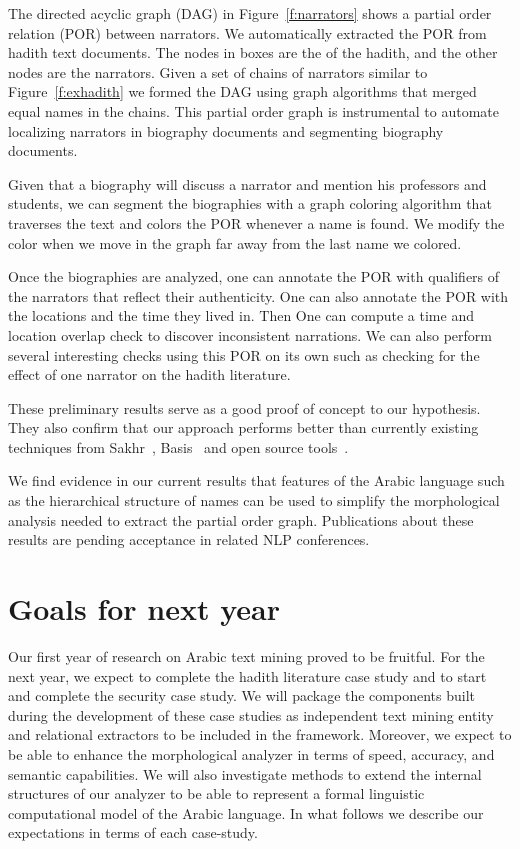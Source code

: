 \documentclass[12pt]{article}
\begin{document}
The directed acyclic graph (DAG) 
in Figure~\ref{f:narrators} shows a partial order relation (POR) between
narrators.
We automatically extracted the POR from hadith text 
documents.
The nodes in boxes are the  of the hadith, 
and the other nodes are the narrators.
Given a set of chains of narrators similar to 
Figure~\ref{f:exhadith} we formed the DAG using graph algorithms 
that merged equal names in the chains. 
This partial order graph is instrumental to automate
localizing narrators in biography documents and
segmenting biography documents.

Given that a biography will discuss a narrator and mention
his professors and students,
we can segment the biographies with a graph coloring algorithm 
that traverses the text and colors the POR whenever
a name is found. 
We modify the color when we move in the graph 
far away from the last name we colored.

Once the biographies are analyzed, one can annotate
the POR with qualifiers of the narrators that reflect
their authenticity. 
One can also annotate the POR with the locations and 
the time they lived in. 
Then One can compute a time and location overlap
check to discover inconsistent narrations.
We can also perform several interesting checks using 
this POR on its own such as checking for the effect of
one narrator on the hadith literature. 

These preliminary results serve as a good proof of concept to our 
hypothesis. They also confirm that our approach performs better than 
currently existing techniques from Sakhr~\cite{Sak09},
Basis~\cite{Bas09} and open source 
tools~\cite{Col09,Otakar:07,Tim04}.

We find evidence in our current results that features 
of the Arabic language such as the hierarchical structure of
names can be used to simplify the morphological analysis
needed to extract the partial order graph. 
Publications about these results are pending acceptance in 
related NLP conferences. 


\section{Goals for next year}
\label{s:nextyear}

Our first year of research on 
Arabic text mining proved to be 
fruitful. 
For the next year, we expect to complete the hadith literature case 
study and to start and complete the security case study. 
We will package the components built during the development of these 
case studies as independent text mining entity and relational 
extractors to be included in the framework.
Moreover, we expect to be able to enhance the morphological analyzer in 
terms of speed, accuracy, and semantic capabilities. 
We will also investigate methods to extend the internal structures 
of our analyzer to be able to represent a formal linguistic
computational model of the Arabic language. 
In what follows we describe our expectations in terms of each case-study.
\end{document}

